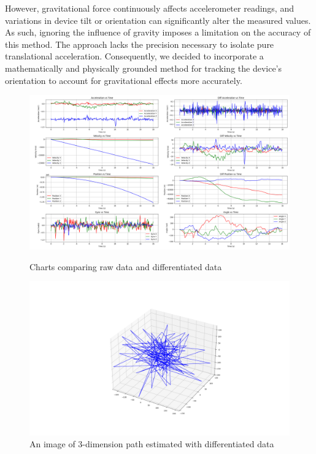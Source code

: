 \documentclass{article}
\begin{document}
However, gravitational force continuously affects accelerometer readings, and variations in device tilt or orientation can significantly alter the measured values. As such, ignoring the influence of gravity imposes a limitation on the accuracy of this method. The approach lacks the precision necessary to isolate pure translational acceleration. Consequently, we decided to incorporate a mathematically and physically grounded method for tracking the device’s orientation to account for gravitational effects more accurately.
\FloatBarrier
\begin{figure}
    \centering
    \includegraphics[width=\textwidth]{Images/data_difference_and_integration.png}
    \caption{Charts comparing raw data and differentiated data}
    \label{fig:data_difference_and_integration}
    \centering
    \includegraphics[width=\textwidth]{Images/error_3d_path.png}
    \caption{An image of 3-dimension path estimated with differentiated data}
    \label{fig:error_3d_path}
\end{figure}

\FloatBarrier
\end{document}
